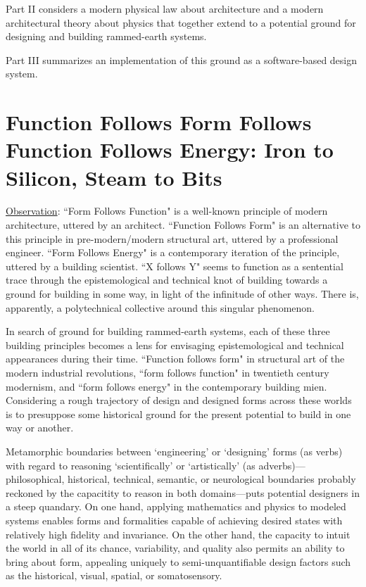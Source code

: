 Part II considers a modern physical law about architecture and a modern architectural theory about physics that together extend to a potential ground for designing and building rammed-earth systems.

Part III summarizes an implementation of this ground as a software-based design system.

\clearpage

\section{Function Follows Form Follows Function Follows Energy: Iron to Silicon, Steam to Bits}

\underline{Observation}: ``Form Follows Function" is a well-known principle of modern architecture, uttered by an architect. ``Function Follows Form" is an alternative to this principle in pre-modern/modern structural art, uttered by a professional engineer. ``Form Follows Energy" is a contemporary iteration of the principle, uttered by a building scientist. ``X follows Y" seems to function as a sentential trace through the epistemological and technical knot of building towards a ground for building in some way, in light of the infinitude of other ways. There is, apparently, a polytechnical collective around this singular phenomenon.

In search of ground for building rammed-earth systems, each of these three building principles becomes a lens for envisaging epistemological and technical appearances during their time. ``Function follows form" in structural art of the modern industrial revolutions, ``form follows function" in twentieth century modernism, and ``form follows energy" in the contemporary building mien. Considering a rough trajectory of design and designed forms across these worlds is to presuppose some historical ground for the present potential to build in one way or another.

Metamorphic boundaries between `engineering' or `designing' forms (as verbs) with regard to reasoning `scientifically' or `artistically' (as adverbs)---philosophical, historical, technical, semantic, or neurological boundaries probably reckoned by the capacitity to reason in both domains---puts potential designers in a steep quandary. On one hand, applying mathematics and physics to modeled systems enables forms and formalities capable of achieving desired states with relatively high fidelity and invariance. On the other hand, the capacity to intuit the world in all of its chance, variability, and quality also permits an ability to bring about form, appealing uniquely to semi-unquantifiable design factors such as the historical, visual, spatial, or somatosensory.



